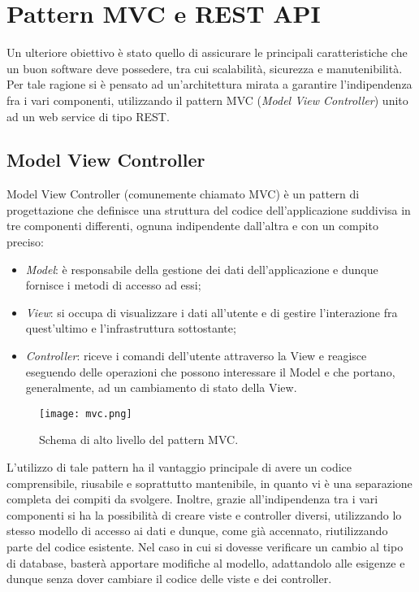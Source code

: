 \section{Pattern MVC e REST API}
Un ulteriore obiettivo è stato quello di assicurare le principali caratteristiche che un buon software deve possedere, tra cui scalabilità, sicurezza e manutenibilità. Per tale ragione si è pensato ad un'architettura mirata a garantire l'indipendenza fra i vari componenti, utilizzando il pattern MVC (\textit{Model View Controller}) unito ad un web service di tipo REST.

\subsection{Model View Controller}
Model View Controller (comunemente chiamato MVC) è un pattern di progettazione che definisce una struttura del codice dell'applicazione suddivisa in tre componenti differenti, ognuna indipendente dall'altra e con un compito preciso:
\begin{itemize}
    \item \textit{Model}: è responsabile della gestione dei dati dell'applicazione e dunque fornisce i metodi di accesso ad essi;
    \item \textit{View}: si occupa di visualizzare i dati all’utente e di gestire l’interazione fra quest’ultimo e l’infrastruttura sottostante;
    \item \textit{Controller}: riceve i comandi dell’utente attraverso la View e reagisce eseguendo delle operazioni che possono interessare il Model e che portano, generalmente, ad un cambiamento di stato della View.
\end{itemize}

\begin{figure}[H]
	\centering
	\texttt{[image: mvc.png]}
	\caption{Schema di alto livello del pattern MVC.}
	\label{fig:mvc}
\end{figure}

\noindent
L'utilizzo di tale pattern ha il vantaggio principale di avere un codice comprensibile, riusabile e soprattutto mantenibile, in quanto vi è una separazione completa dei compiti da svolgere. Inoltre, grazie all'indipendenza tra i vari componenti si ha la possibilità di creare viste e controller diversi, utilizzando lo stesso modello di accesso ai dati e dunque, come già accennato, riutilizzando parte del codice esistente. Nel caso in cui si dovesse verificare un cambio al tipo di database, basterà apportare modifiche al modello, adattandolo alle esigenze e dunque senza dover cambiare il codice delle viste e dei controller.

